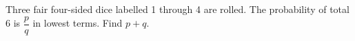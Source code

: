 Three fair four-sided dice labelled 1 through 4 are rolled. The probability of total 6 is $\dfrac{p}{q}$ in lowest terms. Find $p+q$.
